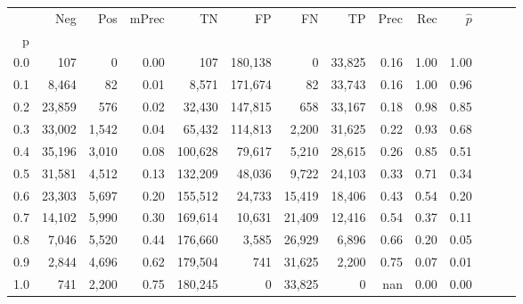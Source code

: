 \begin{tabular}{rrrrrrrrrrrrrr}
\toprule
{} &     Neg &    Pos & mPrec &       TN &       FP &      FN &      TP &  Prec &   Rec & $\hat{p}$ \\
p   &         &        &       &          &          &         &         &       &       &           \\
\midrule
0.0 &     107 &      0 &  0.00 &      107 &  180,138 &       0 &  33,825 &  0.16 &  1.00 &      1.00 \\
0.1 &   8,464 &     82 &  0.01 &    8,571 &  171,674 &      82 &  33,743 &  0.16 &  1.00 &      0.96 \\
0.2 &  23,859 &    576 &  0.02 &   32,430 &  147,815 &     658 &  33,167 &  0.18 &  0.98 &      0.85 \\
0.3 &  33,002 &  1,542 &  0.04 &   65,432 &  114,813 &   2,200 &  31,625 &  0.22 &  0.93 &      0.68 \\
0.4 &  35,196 &  3,010 &  0.08 &  100,628 &   79,617 &   5,210 &  28,615 &  0.26 &  0.85 &      0.51 \\
0.5 &  31,581 &  4,512 &  0.13 &  132,209 &   48,036 &   9,722 &  24,103 &  0.33 &  0.71 &      0.34 \\
0.6 &  23,303 &  5,697 &  0.20 &  155,512 &   24,733 &  15,419 &  18,406 &  0.43 &  0.54 &      0.20 \\
0.7 &  14,102 &  5,990 &  0.30 &  169,614 &   10,631 &  21,409 &  12,416 &  0.54 &  0.37 &      0.11 \\
0.8 &   7,046 &  5,520 &  0.44 &  176,660 &    3,585 &  26,929 &   6,896 &  0.66 &  0.20 &      0.05 \\
0.9 &   2,844 &  4,696 &  0.62 &  179,504 &      741 &  31,625 &   2,200 &  0.75 &  0.07 &      0.01 \\
1.0 &     741 &  2,200 &  0.75 &  180,245 &        0 &  33,825 &       0 &   nan &  0.00 &      0.00 \\
\bottomrule
\end{tabular}
